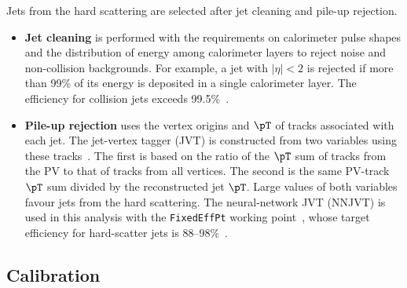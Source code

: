 Jets from the hard scattering are selected after jet cleaning and pile-up rejection.
\begin{itemize}
    \item \textbf{Jet cleaning} is performed with the requirements on calorimeter pulse shapes and the distribution of energy among calorimeter layers to reject noise and non-collision backgrounds. For example, a jet with $|\eta|<2$ is rejected if more than 99\% of its energy is deposited in a single calorimeter layer. The efficiency for collision jets exceeds 99.5\%~\cite{ATLAS2015JetCleaning}.
    \item \textbf{Pile-up rejection} uses the vertex origins and $\pT$ of tracks associated with each jet.
    The jet-vertex tagger (JVT) is constructed from two variables using these tracks~\cite{ATLAS2014JVT}.
    The first is based on the ratio of the $\pT$ sum of tracks from the PV to that of tracks from all vertices.
    The second is the same PV-track $\pT$ sum divided by the reconstructed jet $\pT$.
    Large values of both variables favour jets from the hard scattering.
    The neural-network JVT (NNJVT) is used in this analysis with the \texttt{FixedEffPt} working point~\cite{ATLASNNJVTTagger}, whose target efficiency for hard-scatter jets is $88$--$98\%$~\cite{ATLASNNJVTFixedEffPt}.
\end{itemize}

\subsection{Calibration}

